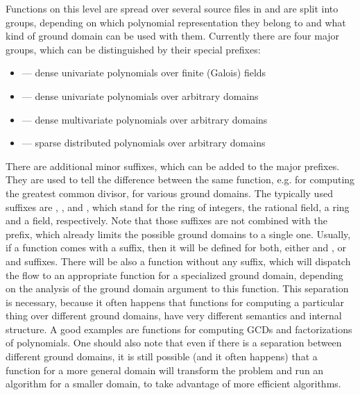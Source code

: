 Functions on this level are spread over several source files in  and are split into
groups, depending on which polynomial representation they belong to and what kind of ground domain
can be used with them. Currently there are four major groups, which can be distinguished by their
special prefixes:
\begin{itemize}
\item {} 
 --- dense univariate polynomials over finite (Galois) fields

\item {} 
 --- dense univariate polynomials over arbitrary domains

\item {} 
 --- dense multivariate polynomials over arbitrary domains

\item {} 
 --- sparse distributed polynomials over arbitrary domains

\end{itemize}

There are additional minor suffixes, which can be added to the major prefixes. They are used to tell
the difference between the same function, e.g. for computing the greatest common divisor, for various
ground domains. The typically used suffixes are , ,  and , which stand
for the ring of integers, the rational field, a ring and a field, respectively. Note that those
suffixes are not combined with the  prefix, which already limits the possible ground domains
to a single one. Usually, if a function comes with a suffix, then it will be defined for both, either
 and , or  and  suffixes. There will be also a function without any suffix,
which will dispatch the flow to an appropriate function for a specialized ground domain, depending on
the analysis of the ground domain argument to this function. This separation is necessary, because it
often happens that functions for computing a particular thing over different ground domains, have very
different semantics and internal structure. A good examples are functions for computing GCDs and
factorizations of polynomials. One should also note that even if there is a separation between different
ground domains, it is still possible (and it often happens) that a function for a more general domain
will transform the problem and run an algorithm for a smaller domain, to take advantage of more efficient
algorithms.

